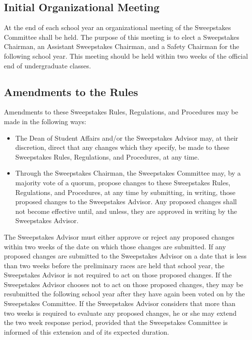 \subsection{Initial Organizational Meeting}

	At the end of each school year an organizational meeting of the Sweepstakes Committee shall be held. The purpose of this meeting is to elect a Sweepstakes Chairman, an Assistant Sweepstakes Chairman, and a Safety Chairman for the following school year. This meeting should be held within two weeks of the official end of undergraduate classes. 

\subsection{Amendments to the Rules}

	Amendments to these Sweepstakes Rules, Regulations, and Procedures may be made in the following ways:

	\begin{itemize}

		\item
		The Dean of Student Affairs and/or the Sweepstakes Advisor may, at their discretion, direct that any changes which they specify, be made to these Sweepstakes Rules, Regulations, and Procedures, at any time.

		\item
		Through the Sweepstakes Chairman, the Sweepstakes Committee may, by a majority vote of a quorum, propose changes to these Sweepstakes Rules, Regulations, and Procedures, at any time by submitting, in writing, those proposed changes to the Sweepstakes Advisor. Any proposed changes shall not become effective until, and unless, they are approved in writing by the Sweepstakes Advisor.

	\end{itemize}

	The Sweepstakes Advisor must either approve or reject any proposed changes within two weeks of the date on which those changes are submitted. If any proposed changes are submitted to the Sweepstakes Advisor on a date that is less than two weeks before the preliminary races are held that school year, the Sweepstakes Advisor is not required to act on those proposed changes. If the Sweepstakes Advisor chooses not to act on those proposed changes, they may be resubmitted the following school year after they have again been voted on by the Sweepstakes Committee. If the Sweepstakes Advisor considers that more than two weeks is required to evaluate any proposed changes, he or she may extend the two week response period, provided that the Sweepstakes Committee is informed of this extension and of its expected duration.

